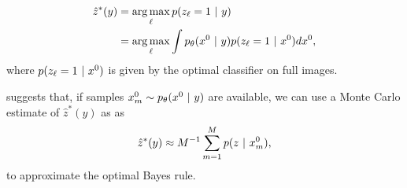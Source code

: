 \begin{align}\label{eqn:bayes_opt_classifier}
\begin{split}
    \hat z^*(y) &= \operatorname*{arg\,max}_{\ell} p(z_\ell=1 ~\vert~ y) \\
    &= \operatorname*{arg\,max}_{\ell} \int p_{\theta}(x^{0} ~\vert~ y) p(z_\ell=1 ~\vert~ x^{0} )dx^{0},
\end{split}
\end{align}
where $p(z_\ell=1 ~\vert~ x^{0})$ is given by the optimal classifier on full images.

 suggests that, if samples $x_m^{0}\sim p_{\theta}(x^{0} ~\vert~ y)$ are available, we can use a Monte Carlo estimate of $\hat z^*(y)$ as
as 
$$
    \hat z^*(y) \approx M^{-1} \sum_{m=1}^M p(z ~\vert~ x_m^{0}),
$$
to approximate the optimal Bayes rule.

